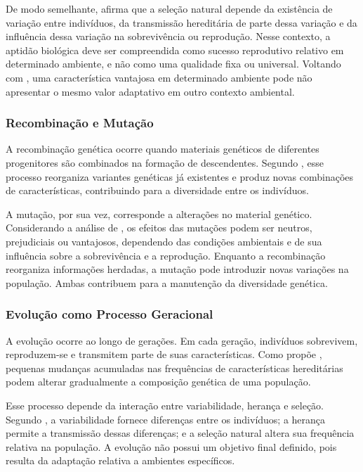 De modo semelhante,  afirma que a seleção natural depende da existência de variação entre indivíduos, da transmissão hereditária de parte dessa variação e da influência dessa variação na sobrevivência ou reprodução. Nesse contexto, a aptidão biológica deve ser compreendida como sucesso reprodutivo relativo em determinado ambiente, e não como uma qualidade fixa ou universal. Voltando com , uma característica vantajosa em determinado ambiente pode não apresentar o mesmo valor adaptativo em outro contexto ambiental.

\subsubsection{Recombinação e Mutação}
\label{subsubsec:recombinacao-mutacao}

A recombinação genética ocorre quando materiais genéticos de diferentes progenitores são combinados na formação de descendentes. Segundo , esse processo reorganiza variantes genéticas já existentes e produz novas combinações de características, contribuindo para a diversidade entre os indivíduos.

A mutação, por sua vez, corresponde a alterações no material genético. Considerando a análise de , os efeitos das mutações podem ser neutros, prejudiciais ou vantajosos, dependendo das condições ambientais e de sua influência sobre a sobrevivência e a reprodução. Enquanto a recombinação reorganiza informações herdadas, a mutação pode introduzir novas variações na população. Ambas contribuem para a manutenção da diversidade genética.

\subsubsection{Evolução como Processo Geracional}
\label{subsubsec:evolucao-processo-geracional}

A evolução ocorre ao longo de gerações. Em cada geração, indivíduos sobrevivem, reproduzem-se e transmitem parte de suas características. Como propõe  , pequenas mudanças acumuladas nas frequências de características hereditárias podem alterar gradualmente a composição genética de uma população.

Esse processo depende da interação entre variabilidade, herança e seleção. Segundo , a variabilidade fornece diferenças entre os indivíduos; a herança permite a transmissão dessas diferenças; e a seleção natural altera sua frequência relativa na população. A evolução não possui um objetivo final definido, pois resulta da adaptação relativa a ambientes específicos.

